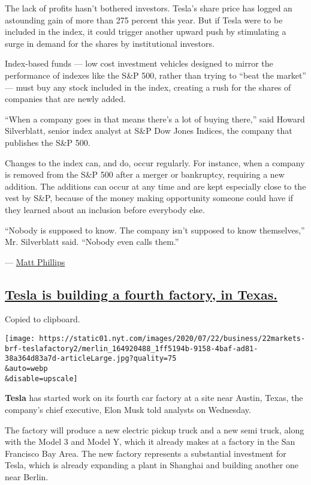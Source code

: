 The lack of profits hasn't bothered investors. Tesla's share price has
logged an astounding gain of more than 275 percent this year. But if
Tesla were to be included in the index, it could trigger another upward
push by stimulating a surge in demand for the shares by institutional
investors.

Index-based funds --- low cost investment vehicles designed to mirror
the performance of indexes like the S\&P 500, rather than trying to
``beat the market'' --- must buy any stock included in the index,
creating a rush for the shares of companies that are newly added.

``When a company goes in that means there's a lot of buying there,''
said Howard Silverblatt, senior index analyst at S\&P Dow Jones Indices,
the company that publishes the S\&P 500.

Changes to the index can, and do, occur regularly. For instance, when a
company is removed from the S\&P 500 after a merger or bankruptcy,
requiring a new addition. The additions can occur at any time and are
kept especially close to the vest by S\&P, because of the money making
opportunity someone could have if they learned about an inclusion before
everybody else.

``Nobody is supposed to know. The company isn't supposed to know
themselves,'' Mr. Silverblatt said. ``Nobody even calls them.''

--- \href{https://www.nytimes.com/by/matt-phillips}{Matt Phillips}

\hypertarget{tesla-is-building-a-fourth-factory-in-texas}{%
\subsection{\texorpdfstring{\protect\hyperlink{tesla-is-building-a-fourth-factory-in-texas}{Tesla
is building a fourth factory, in
Texas.}}{Tesla is building a fourth factory, in Texas.}}\label{tesla-is-building-a-fourth-factory-in-texas}}

Copied to clipboard.

\texttt{[image: https://static01.nyt.com/images/2020/07/22/business/22markets-brf-teslafactory2/merlin\_164920488\_1ff5194b-9158-4baf-ad81-38a364d83a7d-articleLarge.jpg?quality=75\\\&auto=webp\\\&disable=upscale]}

\textbf{Tesla} has started work on its fourth car factory at a site near
Austin, Texas, the company's chief executive, Elon Musk told analysts on
Wednesday.

The factory will produce a new electric pickup truck and a new semi
truck, along with the Model 3 and Model Y, which it already makes at a
factory in the San Francisco Bay Area. The new factory represents a
substantial investment for Tesla, which is already expanding a plant in
Shanghai and building another one near Berlin.

